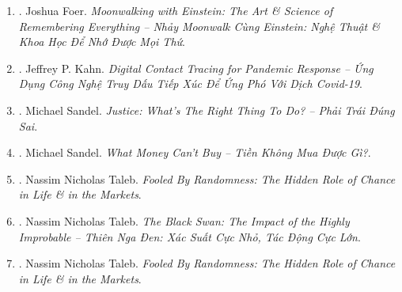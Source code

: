 \documentclass{article}
\begin{document}
\begin{enumerate}
\begin{itemize}
		\item ``{\sc Joshua Foer} proves what few of us are willing to get our heads around: there's more room in our brains that we ever imagined. {\it Moonwalking with {\sc Einstein}} isn't a how-to guide to remembering a name or where you put your keys. It's a riveting exploration of humankind's centuries-old obsession with memory, \& 1 man's improbable quest to master his own.'' -- {\sc Stefan Fatsis}, author of {\it A Few Seconds of Panic \& Word Freak}
	\end{itemize}
	{\sf About the Author.} {\sc Joshua Foer} was born in Washington, DC in 1982 \& lives in New Haven, CT with his wife Dinah. His writing has appeared in {\it National Geographic, Esquire, Slate, Outside, New York Times}, \& other publications. He is the co-founder of the Atlas Obscura, an online guide to the world's wonders \& curiosities. He is also the co-founder of the architectural design competition, Sukkah City. {\it Moonwalking with {\sc Einstein}} is his 1st book.
		
	\item \cite{Foer_remember_VN}. {\sc Joshua Foer}. {\it Moonwalking with Einstein: The Art \& Science of Remembering Everything -- Nhảy Moonwalk Cùng Einstein: Nghệ Thuật \& Khoa Học Để Nhớ Được Mọi Thứ}.\hfill{\sf[done]}
	
	\item \cite{Kahn_diginal_pandemic_VN}. Jeffrey P. Kahn. {\it Digital Contact Tracing for Pandemic Response -- Ứng Dụng Công Nghệ Truy Dấu Tiếp Xúc Để Ứng Phó Với Dịch Covid-19}.\hfill{\sf[done]}
	
	\item \cite{Sandel_justice}. Michael Sandel. {\it Justice: What's The Right Thing To Do? -- Phải Trái Đúng Sai}.\hfill{\sf[done]}
	
	\item \cite{Sandel_money}. Michael Sandel. {\it What Money Can't Buy -- Tiền Không Mua Được Gì?}.\hfill{\sf[done]}
	
	\item \cite{Taleb_randomness}. Nassim Nicholas Taleb. {\it Fooled By Randomness: The Hidden Role of Chance in Life \& in the Markets}.\hfill{\sf[reading]}
	
	\item \cite{Taleb_black_swan_VN}. Nassim Nicholas Taleb. {\it The Black Swan: The Impact of the Highly Improbable -- Thiên Nga Đen: Xác Suất Cực Nhỏ, Tác Động Cực Lớn}.\hfill{\sf[reading]}
	
	\item \cite{Taleb_randomness}. Nassim Nicholas Taleb. {\it Fooled By Randomness: The Hidden Role of Chance in Life \& in the Markets}.
	

\end{enumerate}
\end{document}
